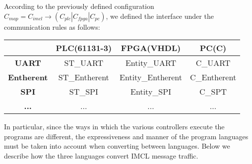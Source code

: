 According to the previously defined configuration $C_{map} = C_{imcl} \rightarrow (C_{plc} | C_{fpga} | C_{pc})$, we defined the interface under the communication rules as follows:
\begin{table}[!htb]
\centering
\small
    \begin{tabular}{|c|c|c|c|}
    \hline
    \textbf{ } & \textbf{PLC(61131-3)} & \textbf{FPGA(VHDL)} &  \textbf{PC(C)} \\
    \hline
    \textbf{UART}   & ST\_UART & Entity\_UART & C\_UART \\
    \textbf{Entherent} & ST\_Entherent & Entity\_Entherent & C\_Entherent \\
    \textbf{SPI} & ST\_SPI & Entity\_SPI & C\_SPT \\
    \textbf{...} & ... & ... & ... \\
    \hline
    \end{tabular}
\end{table}

In particular, since the ways in which the various controllers execute the programs are different, the expressiveness and manner of the program languages must be taken into account when converting between languages. Below we describe how the three languages convert IMCL message traffic.

